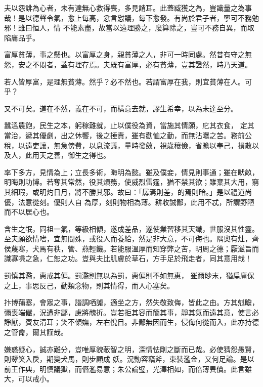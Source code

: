 \begin{pinyinscope}
 夫以怨誹為心者，未有達無心救得喪，多見誚耳。此蓋臧獲之為，豈識量之為事哉！是以德聲令氣，愈上每高，忿言懟議，每下愈發。有尚於君子者，寧可不務勉邪！雖曰恒人，情
 不能素盡，故當以遠理勝之，麼算除之，豈可不務自異，而取陷庸品乎。



 富厚貧薄，事之懸也。以富厚之身，親貧薄之人，非可一時同處。然昔有守之無怨，安之不悶者，蓋有理存焉。夫既有富厚，必有貧薄，豈其證然，時乃天道。



 若人皆厚富，是理無貧薄。然乎？必不然也。若謂富厚在我，則宜貧薄在人。可乎？



 又不可矣。道在不然，義在不可，而橫意去就，謬生希幸，以為未達至分。



 蠶溫農飽，民生之本，躬稼難就，止以僕役為資，當施其情願，庀其衣食，
 定其當治，遞其優劇，出之休饗，後之捶責，雖有勸恤之勤，而無沾曝之苦。務前公稅，以遠吏讓，無急傍費，以息流議，量時發斂，視歲穰儉，省贍以奉己，損散以及人，此用天之善，御生之得也。



 率下多方，見情為上；立長多術，晦明為懿。雖及僕妾，情見則事通；雖在畎畝，明晦則功博。若奪其常然，役其煩務，使威烈雷霆，猶不禁其欲；雖棄其大用，窮其細瑕，或明灼日月，將不勝其邪。故曰：「孱焉則差，的焉則暗。」是以禮道尚優，法意從刻。優則人自
 為厚，刻則物相為薄。耕收誠鄙，此用不忒，所謂野陋而不以居心也。



 含生之氓，同祖一氣，等級相傾，遂成差品，遂使業習移其天識，世服沒其性靈。至夫願欲情嗜，宜無間殊，或役人而養給，然是非大意，不可侮也。隅奧有灶，齊侯蔑寒，犬馬有秩，管、燕輕饑。若能服溫厚而知穿弊之苦，明周之德；厭滋旨而識寡嗛之急，仁恕之功。豈與夫比肌膚於草石，方手足於飛走者，同其意用哉！



 罰慎其濫，惠戒其偏。罰濫則無以為罰，惠偏則不如無惠，
 雖爾眇末，猶扁庸保之上，事思反己，動類念物，則其情得，而人心塞矣。



 抃博蒱塞，會眾之事，諧調哂謔，適坐之方，然失敬致侮，皆此之由。方其剋瞻，彌喪端儼，況遭非鄙，慮將醜折。豈若拒其容而簡其事，靜其氣而遠其意，使言必諍厭，賓友清耳；笑不傾嫵，左右悅目。非鄙無因而生，侵侮何從而入，此亦持德之管龠，爾其謹哉。



 嫌惑疑心，誠亦難分，豈唯厚貌蔽智之明，深情怯剛之斷而已哉。必使猜怨愚賢，則顰笑入戾，期變犬馬，則步顧成
 妖。況動容竊斧，束裝濫金，又何足論。是以前王作典，明慎議獄，而僭濫易意；朱公論璧，光澤相如，而倍薄異價。此言雖大，可以戒小。




\end{pinyinscope}
